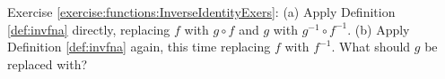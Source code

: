 \noindent Exercise \ref{exercise:functions:InverseIdentityExers}: (a) Apply Definition  \ref{def:invfna} directly, replacing $f$ with
$g \circ f$ and $g$ with $g^{-1} \circ f^{-1}$. (b) Apply Definition  \ref{def:invfna} again, this time replacing $f$ with
$f^{-1}$. What should $g$ be replaced with?

